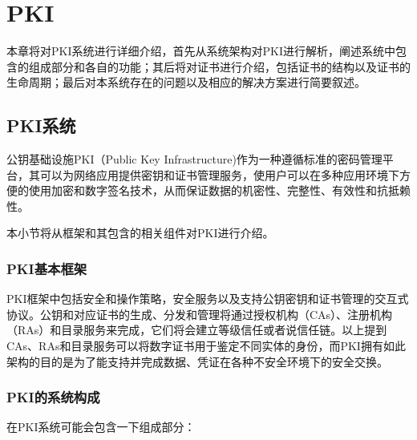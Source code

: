 
\chapter{PKI}

本章将对PKI系统进行详细介绍，首先从系统架构对PKI进行解析，阐述系统中包含的组成部分和各自的功能；其后将对证书进行介绍，包括证书的结构以及证书的生命周期；最后对本系统存在的问题以及相应的解决方案进行简要叙述。

\section{PKI系统}

公钥基础设施PKI（Public Key Infrastructure)作为一种遵循标准的密码管理平台，其可以为网络应用提供密钥和证书管理服务，使用户可以在多种应用环境下方便的使用加密和数字签名技术，从而保证数据的机密性、完整性、有效性和抗抵赖性。

本小节将从框架和其包含的相关组件对PKI进行介绍。

\subsection{PKI基本框架}

PKI框架中包括安全和操作策略，安全服务以及支持公钥密钥和证书管理的交互式协议。公钥和对应证书的生成、分发和管理将通过授权机构（CAs）、注册机构（RAs）和目录服务来完成\supercite{weise2001public}，它们将会建立等级信任或者说信任链。以上提到CAs、RAs和目录服务可以将数字证书用于鉴定不同实体的身份，而PKI拥有如此架构的目的是为了能支持并完成数据、凭证在各种不安全环境下的安全交换。

\subsection{PKI的系统构成}

在PKI系统可能会包含一下组成部分：

